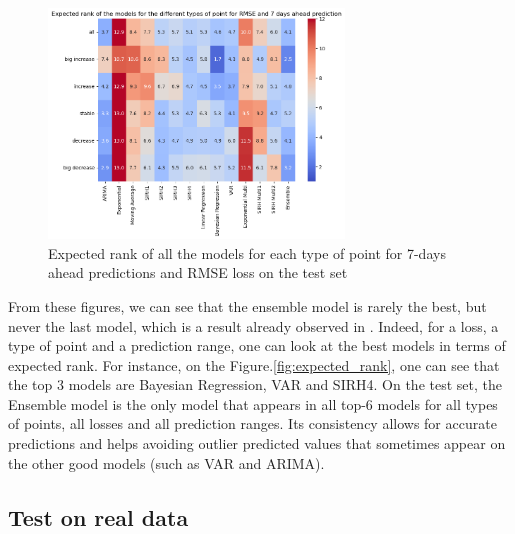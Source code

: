 \begin{figure}
    \centering
    \includegraphics[width=0.7\textwidth]{figures/heatmap_esb_7.png}
    \caption{Expected rank of all the models for each type of point for 7-days ahead predictions and RMSE loss on the test set}
    \label{fig:heatmap_esb_7}
\end{figure}

From these figures, we can see that the ensemble model is rarely the best, but never the last model, which is a result already observed in \cite{cramer2022evaluation}.
Indeed, for a loss, a type of point and a prediction range, one can look at the best models in terms of expected rank.
For instance, on the Figure.\ref{fig:expected_rank}, one can see that the top 3 models are Bayesian Regression, VAR and SIRH4. 
On the test set, the Ensemble model is the only model that appears in all top-6 models for all types of points, all losses and all prediction ranges.
Its consistency allows for accurate predictions and helps avoiding outlier predicted values that sometimes appear on the other good models (such as VAR and ARIMA). 


\subsection{Test on real data}

